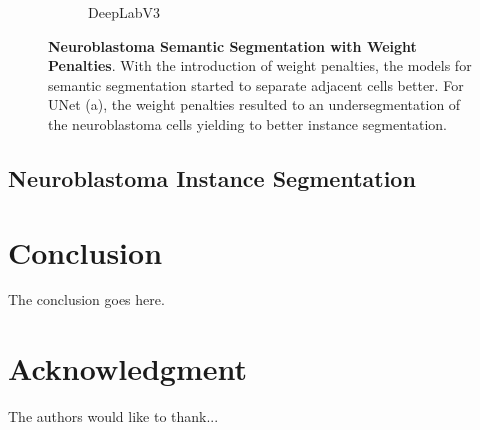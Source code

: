 \documentclass[journal]{IEEEtran}
\begin{document}
\begin{figure}
\begin{subfigure}[b]{0.45\linewidth}
\caption{DeepLabV3}
\end{subfigure}
\caption{\textbf{Neuroblastoma Semantic Segmentation with Weight Penalties}. With the introduction of weight penalties, the models for semantic segmentation started to separate adjacent cells better. For UNet (a), the weight penalties resulted to an undersegmentation of the neuroblastoma cells yielding to better instance segmentation.}
\label{fig:weight_map}
\end{figure}
\subsection{Neuroblastoma Instance Segmentation}


\section{Conclusion}
The conclusion goes here.


\section*{Acknowledgment}


The authors would like to thank...


\ifCLASSOPTIONcaptionsoff
  \newpage
\fi





%


%




\end{document}

